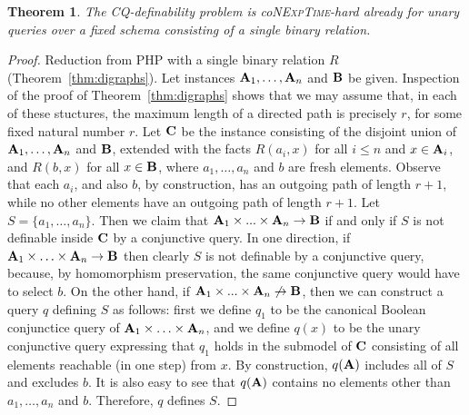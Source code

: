 \documentclass{article}
\newtheorem{theorem}{Theorem}
\newcommand{\aest}{{\bf A}}
\newcommand{\best}{{\bf B}}
\newcommand{\cest}{{\bf C}}
\newcommand{\nexptime}{\textsc{NExpTime}\xspace}
\begin{document}
\begin{theorem}
 The CQ-definability problem is
  co\nexptime-hard already for unary queries over a fixed schema
  consisting of a single binary relation. 
\end{theorem}



\begin{proof}
 Reduction from PHP with a single binary relation $R$
  (Theorem~\ref{thm:digraphs}).  Let instances $\aest_1,
 \ldots, \aest_n$
  and $\best$ be given. Inspection of the proof of
  Theorem~\ref{thm:digraphs} shows that we may assume that, in each
  of these stuctures, the maximum length of a directed path is precisely $r$,
  for some fixed natural number $r$.  Let $\cest$ be the instance consisting
  of the disjoint union of $\aest_1, \ldots, \aest_n$ and $\best$, extended with
  the facts $R(a_i,x)$ for all $i\leq n$ and $x\in \aest_i$, and $R(b,x)$
  for all $x\in \best$, where $a_1, \ldots, a_n$ and $b$ are fresh
  elements. Observe that each $a_i$, and also $b$, by construction, has an outgoing
  path of length $r+1$, while no other elements have an outgoing
  path of length $r+1$.
  Let $S=\{a_1, \ldots,
  a_n\}$.  Then we claim that $\aest_1 \times ... \times \aest_n \to \best$ if and
  only if $S$ is not definable inside $\cest$ by a conjunctive query. In one direction,
  if $\aest_1 \times\ldots\times \aest_n \to \best$ then clearly $S$ is not
  definable by a conjunctive query, because, by homomorphism preservation, the same
  conjunctive query would have to select $b$.  On the other hand, if 
  $\aest_1 \times ... \times \aest_n \not\to \best$, then we can
  construct a query $q$ defining $S$ as follows: first we define $q_1$
  to be the canonical Boolean  conjunctice query of $\aest_1 \times\ldots\times
  \aest_n$, and we define $q(x)$ to be the unary conjunctive query
  expressing that $q_1$ holds in the submodel of $\cest$ consisting of
  all elements reachable (in one step) from $x$. By
  construction,  $q(\aest)$ includes all of $S$ and excludes $b$. It
  is also easy to see that $q(\aest)$ contains no elements other than
  $a_1, \ldots, a_n$ and $b$. Therefore, $q$ defines $S$. 
\end{proof}






\end{document}
